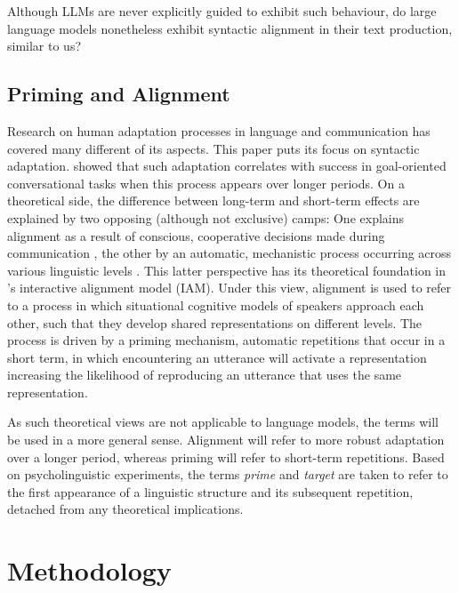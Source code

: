 \documentclass[11pt]{article}
\begin{document}
Although LLMs are never explicitly guided to exhibit such behaviour, do large language models nonetheless exhibit syntactic alignment in their text production, similar to us?

\subsection{Priming and Alignment}
Research on human adaptation processes in language and communication has covered many different of its aspects. This paper puts its focus on syntactic adaptation. \citealp{reitter2008context} showed that such adaptation correlates with success in goal-oriented conversational tasks when this process appears over longer periods.
On a theoretical side, the difference between long-term and short-term effects are explained by two opposing (although not exclusive) camps: One explains alignment as a result of conscious, cooperative decisions made during communication \cite{brennan1996conceptual_pacts}, the other by an automatic, mechanistic process occurring across various linguistic levels \cite{Rasenberg2020framework}. This latter perspective has its theoretical foundation in \citealp{Pickering_Garrod_2004}'s interactive alignment model (IAM). Under this view, alignment is used to refer to a process in which situational cognitive models of speakers approach each other, such that they develop shared representations on different levels. The process is driven by a priming mechanism, automatic repetitions that occur in a short term, in which encountering an utterance will activate a representation increasing the likelihood of reproducing an utterance that uses the same representation.

As such theoretical views are not applicable to language models, the terms will be used in a more general sense.
Alignment will refer to more robust adaptation over a longer period, whereas priming will refer to short-term repetitions.
Based on psycholinguistic experiments, the terms \textit{prime} and \textit{target} are taken to refer to the first appearance of a linguistic structure and its subsequent repetition, detached from any theoretical implications.

\section{Methodology}\label{sec:methodology}
\end{document}
